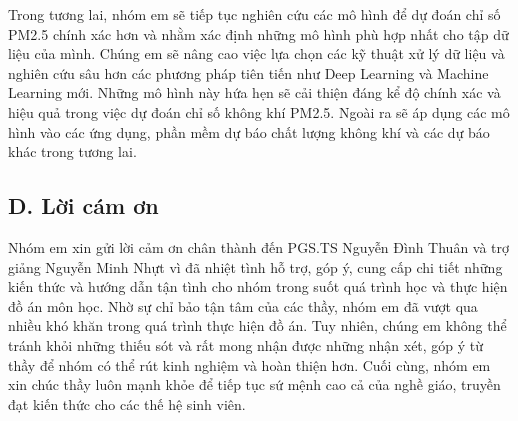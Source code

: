 Trong tương lai, nhóm em sẽ tiếp tục nghiên cứu các mô hình để dự đoán chỉ số PM2.5 chính xác hơn và nhằm xác định những mô hình phù hợp nhất cho tập dữ liệu của mình. Chúng em sẽ nâng cao việc lựa chọn các kỹ thuật xử lý dữ liệu và nghiên cứu sâu hơn các phương pháp tiên tiến như Deep Learning và Machine Learning mới. Những mô hình này hứa hẹn sẽ cải thiện đáng kể độ chính xác và hiệu quả trong việc dự đoán chỉ số không khí PM2.5. Ngoài ra sẽ áp dụng các mô hình vào các ứng dụng, phần mềm dự báo chất lượng không khí và các dự báo khác trong tương lai.

\subsection*{D. Lời cám ơn}

Nhóm em xin gửi lời cảm ơn chân thành đến PGS.TS Nguyễn Đình Thuân và trợ giảng Nguyễn Minh Nhựt vì đã nhiệt tình hỗ trợ, góp ý, cung cấp chi tiết những kiến thức và hướng dẫn tận tình cho nhóm trong suốt quá trình học và thực hiện đồ án môn học. Nhờ sự chỉ bảo tận tâm của các thầy, nhóm em đã vượt qua nhiều khó khăn trong quá trình thực hiện đồ án. Tuy nhiên, chúng em không thể tránh khỏi những thiếu sót và rất mong nhận được những nhận xét, góp ý từ thầy để nhóm có thể rút kinh nghiệm và hoàn thiện hơn. Cuối cùng, nhóm em xin chúc thầy luôn mạnh khỏe để tiếp tục sứ mệnh cao cả của nghề giáo, truyền đạt kiến thức cho các thế hệ sinh viên.

